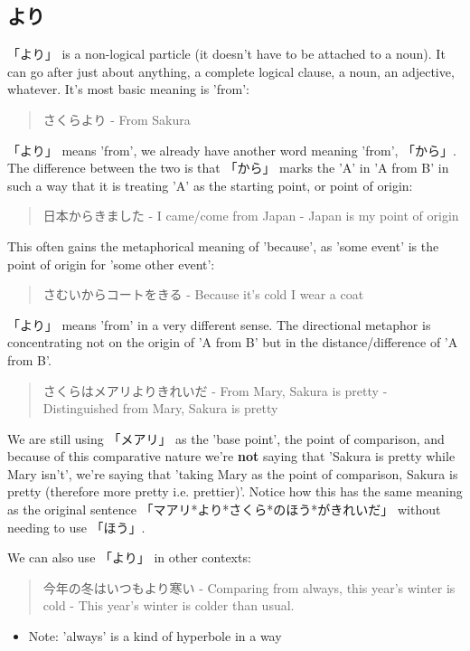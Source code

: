 \documentclass[11pt]{article}
\begin{document}
\subsection{より}
\label{sec:org1ae8ff2}
「より」 is a non-logical particle (it doesn't have to be attached to a noun). It can go after just about anything, a complete logical clause, a noun, an adjective, whatever. It's most basic meaning is 'from':
\begin{quote}
さくらより - From Sakura
\end{quote}

「より」 means 'from', we already have another word meaning 'from', 「から」. The difference between the two is that 「から」 marks the 'A' in 'A from B' in such a way that it is treating 'A' as the starting point, or point of origin:
\begin{quote}
日本からきました - I came/come from Japan - Japan is my point of origin
\end{quote}
This often gains the metaphorical meaning of 'because', as 'some event' is the point of origin for 'some other event':
\begin{quote}
さむいからコートをきる - Because it's cold I wear a coat
\end{quote}

「より」 means 'from' in a very different sense. The directional metaphor is concentrating not on the origin of 'A from B' but in the distance/difference of 'A from B'.
\begin{quote}
さくらはメアリよりきれいだ - From Mary, Sakura is pretty - Distinguished from Mary, Sakura is pretty
\end{quote}
We are still using 「メアリ」 as the 'base point', the point of comparison, and because of this comparative nature we're \textbf{not} saying that 'Sakura is pretty while Mary isn't', we're saying that 'taking Mary as the point of comparison, Sakura is pretty (therefore more pretty i.e. prettier)'. Notice how this has the same meaning as the original sentence 「マアリ*より*さくら*のほう*がきれいだ」 without needing to use 「ほう」.

We can also use 「より」 in other contexts:
\begin{quote}
今年の冬はいつもより寒い - Comparing from always, this year's winter is cold - This year's winter is colder than usual.
\end{quote}
\begin{itemize}
\item Note: 'always' is a kind of hyperbole in a way
\end{itemize}
\end{document}
